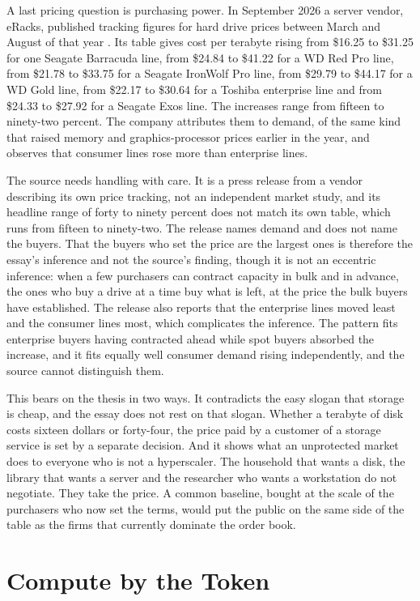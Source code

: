 \documentclass[12pt]{article}
\begin{document}
A last pricing question is purchasing power. In September 2026 a server vendor, eRacks, published tracking figures for hard drive prices between March and August of that year \cite{eracks}. Its table gives cost per terabyte rising from \$16.25 to \$31.25 for one Seagate Barracuda line, from \$24.84 to \$41.22 for a WD Red Pro line, from \$21.78 to \$33.75 for a Seagate IronWolf Pro line, from \$29.79 to \$44.17 for a WD Gold line, from \$22.17 to \$30.64 for a Toshiba enterprise line and from \$24.33 to \$27.92 for a Seagate Exos line. The increases range from fifteen to ninety-two percent. The company attributes them to demand, of the same kind that raised memory and graphics-processor prices earlier in the year, and observes that consumer lines rose more than enterprise lines.

The source needs handling with care. It is a press release from a vendor describing its own price tracking, not an independent market study, and its headline range of forty to ninety percent does not match its own table, which runs from fifteen to ninety-two. The release names demand and does not name the buyers. That the buyers who set the price are the largest ones is therefore the essay's inference and not the source's finding, though it is not an eccentric inference: when a few purchasers can contract capacity in bulk and in advance, the ones who buy a drive at a time buy what is left, at the price the bulk buyers have established. The release also reports that the enterprise lines moved least and the consumer lines most, which complicates the inference. The pattern fits enterprise buyers having contracted ahead while spot buyers absorbed the increase, and it fits equally well consumer demand rising independently, and the source cannot distinguish them.

This bears on the thesis in two ways. It contradicts the easy slogan that storage is cheap, and the essay does not rest on that slogan. Whether a terabyte of disk costs sixteen dollars or forty-four, the price paid by a customer of a storage service is set by a separate decision. And it shows what an unprotected market does to everyone who is not a hyperscaler. The household that wants a disk, the library that wants a server and the researcher who wants a workstation do not negotiate. They take the price. A common baseline, bought at the scale of the purchasers who now set the terms, would put the public on the same side of the table as the firms that currently dominate the order book.

\section{Compute by the Token}
\end{document}

